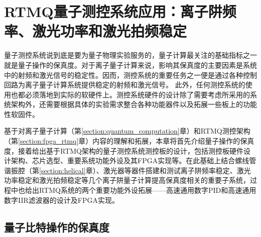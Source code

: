 

\chapter[RTMQ测控系统应用：离子阱频率、激光功率和激光拍频稳定]{RTMQ量子测控系统应用：离子阱频率、激光功率和激光拍频稳定\label{section:implementation}}


量子测控系统说到底是要为量子物理实验服务的，量子计算最关注的基础指标之一就是量子操作的保真度。对于离子量子计算来说，影响其保真度的主要因素是系统中的射频和激光信号的稳定性。因而，测控系统的重要任务之一便是通过各种控制回路为离子量子计算系统提供稳定的射频和激光信号。
此外，任何测控系统的使用也都必须落地到实际的软硬件上。测控系统硬件的设计除了需要考虑所采用的系统架构外，还需要根据具体的实验需求整合各种功能器件以及拓展一些板上的功能性软固件。

基于对离子量子计算（第\ref{section:quantum_computation}章）和RTMQ测控架构（第\ref{section:fpga_rtmq}章）内容的理解和拓展，本章将首先介绍量子操作的保真度，接着给出基于RTMQ架构的量子测控系统测控板的设计，包括测控板硬件设计架构、芯片选型、重要系统功能外设及其FPGA实现等。在此基础上结合螺线管谐振腔（第\ref{section:helical}章）、激光器等器件搭建和测试离子阱频率稳定、激光功率稳定和激光拍频稳定等几个离子阱量子计算提高保真度相关的重要子系统，过程中也给出RTMQ系统的两个重要功能外设拓展——高速通用数字PID和高速通用数字IIR滤波器的设计及FPGA实现。






\section[量子比特操作的保真度]{量子比特操作的保真度}


